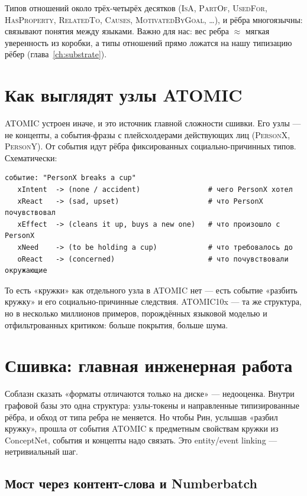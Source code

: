 Типов отношений около трёх-четырёх десятков (\textsc{IsA}, \textsc{PartOf},
\textsc{UsedFor}, \textsc{HasProperty}, \textsc{RelatedTo}, \textsc{Causes},
\textsc{MotivatedByGoal}, \dots), и рёбра многоязычны: связывают понятия между
языками. Важно для нас: вес ребра $\approx$ мягкая уверенность из коробки, а типы
отношений прямо ложатся на нашу типизацию рёбер (глава~\ref{ch:substrate}).

\section{Как выглядят узлы ATOMIC}

ATOMIC устроен иначе, и это источник главной сложности сшивки. Его узлы — не
концепты, а события-фразы с плейсхолдерами действующих лиц (\textsc{PersonX},
\textsc{PersonY}). От события идут рёбра фиксированных социально-причинных типов.
Схематически:

\begin{lstlisting}[style=pseudo]
событие: "PersonX breaks a cup"
   xIntent  -> (none / accident)                # чего PersonX хотел
   xReact   -> (sad, upset)                     # что PersonX почувствовал
   xEffect  -> (cleans it up, buys a new one)   # что произошло с PersonX
   xNeed    -> (to be holding a cup)            # что требовалось до
   oReact   -> (concerned)                      # что почувствовали окружающие
\end{lstlisting}

То есть «кружки» как отдельного узла в ATOMIC нет — есть событие «разбить кружку» и
его социально-причинные следствия. ATOMIC10x — та же структура, но в несколько
миллионов примеров, порождённых языковой моделью и отфильтрованных критиком: больше
покрытия, больше шума.

\section{Сшивка: главная инженерная работа}

Соблазн сказать «форматы отличаются только на диске» — недооценка. Внутри графовой
базы это одна структура: узлы-токены и направленные типизированные рёбра, и обход от
типа ребра не меняется. Но чтобы Рин, услышав «разбил кружку», прошла от события
ATOMIC к предметным свойствам кружки из ConceptNet, события и концепты надо связать.
Это entity/event linking — нетривиальный шаг.

\subsection{Мост через контент-слова и Numberbatch}

